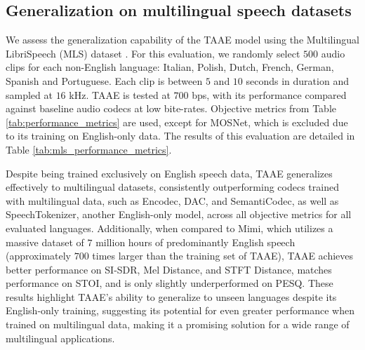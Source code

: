 \documentclass{article} %
\begin{document}
\subsection{Generalization on multilingual speech datasets}
\label{app:multilingual}
We assess the generalization capability of the TAAE model using the Multilingual LibriSpeech (MLS) dataset \citep{pratap2020mls}. For this evaluation, we randomly select $500$ audio clips for each non-English language: Italian, Polish, Dutch, French, German, Spanish and Portuguese. Each clip is between $5$ and $10$ seconds in duration and sampled at $16$ kHz. TAAE is tested at $700$ bps, with its performance compared against baseline audio codecs at low bite-rates. Objective metrics from Table \ref{tab:performance_metrics} are used, except for MOSNet, which is excluded due to its training on English-only data. The results of this evaluation are detailed in Table \ref{tab:mls_performance_metrics}.

Despite being trained exclusively on English speech data, TAAE generalizes effectively to multilingual datasets, consistently outperforming codecs trained with multilingual data, such as Encodec, DAC, and SemantiCodec, as well as SpeechTokenizer, another English-only model, across all objective metrics for all evaluated languages. Additionally, when compared to Mimi, which utilizes a massive dataset of $7$ million hours of predominantly English speech (approximately $700$ times larger than the training set of TAAE), TAAE achieves better performance on SI-SDR, Mel Distance, and STFT Distance, matches performance on STOI, and is only slightly underperformed on PESQ. These results highlight TAAE’s ability to generalize to unseen languages despite its English-only training, suggesting its potential for even greater performance when trained on multilingual data, making it a promising solution for a wide range of multilingual applications.
\end{document}
